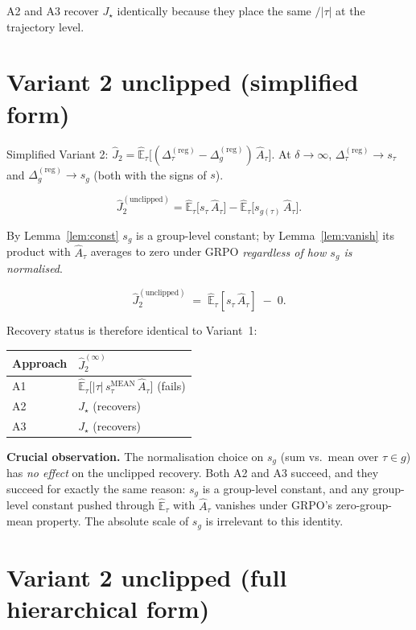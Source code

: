 \documentclass[11pt]{article}
\newcommand{\Ehat}{\widehat{\mathbb{E}}}
\newcommand{\smean}{s^{\text{MEAN}}}
\begin{document}
A2 and A3 recover $J_\star$ identically because they place the same
$/|\tau|$ at the trajectory level.

\section{Variant 2 unclipped (simplified form)}

Simplified Variant 2: $\hat J_2 = \Ehat_\tau\bigl[(\Delta_\tau^{(\text{reg})} - \Delta_g^{(\text{reg})})\,\hat A_\tau\bigr]$.
At $\delta\to\infty$, $\Delta_\tau^{(\text{reg})}\to s_\tau$ and
$\Delta_g^{(\text{reg})}\to s_g$ (both with the signs of $s$).

\[
\hat J_2^{(\text{unclipped})}
  = \Ehat_\tau\bigl[s_\tau\,\hat A_\tau\bigr]
   - \Ehat_\tau\bigl[s_{g(\tau)}\,\hat A_\tau\bigr].
\]

By Lemma~\ref{lem:const} $s_g$ is a group-level constant; by
Lemma~\ref{lem:vanish} its product with $\hat A_\tau$ averages to zero
under GRPO \emph{regardless of how $s_g$ is normalised}.

\[
\hat J_2^{(\text{unclipped})} \;=\; \Ehat_\tau[s_\tau\,\hat A_\tau] \;-\; 0.
\]

Recovery status is therefore identical to Variant~1:

\begin{center}
\begin{tabular}{l l}
\textbf{Approach} & \textbf{$\hat J_2^{(\infty)}$} \\ \hline
A1 & $\Ehat_\tau\bigl[|\tau|\,\smean_\tau\,\hat A_\tau\bigr]$ (fails) \\
A2 & $J_\star$ (recovers) \\
A3 & $J_\star$ (recovers) \\
\end{tabular}
\end{center}

\textbf{Crucial observation.} The normalisation choice on $s_g$ (sum vs.\
mean over $\tau\in g$) has \emph{no effect} on the unclipped recovery. Both
A2 and A3 succeed, and they succeed for exactly the same reason: $s_g$ is
a group-level constant, and any group-level constant pushed through
$\Ehat_\tau$ with $\hat A_\tau$ vanishes under GRPO's zero-group-mean
property. The absolute scale of $s_g$ is irrelevant to this identity.

\section{Variant 2 unclipped (full hierarchical form)}
\end{document}

